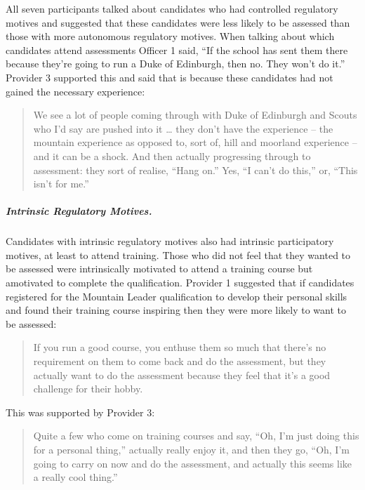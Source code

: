 \documentclass[
  12pt,
  a4paper,
]{book}
\begin{document}
All seven participants talked about candidates who had controlled regulatory motives and suggested that these candidates were less likely to be assessed than those with more autonomous regulatory motives. When talking about which candidates attend assessments Officer 1 said, ``If the school has sent them there because they're going to run a Duke of Edinburgh, then no. They won't do it.'' Provider 3 supported this and said that is because these candidates had not gained the necessary experience:

\begin{quote}
We see a lot of people coming through with Duke of Edinburgh and Scouts who I'd say are pushed into it \ldots{} they don't have the experience -- the mountain experience as opposed to, sort of, hill and moorland experience -- and it can be a shock. And then actually progressing through to assessment: they sort of realise, ``Hang on.'' Yes, ``I can't do this,'' or, ``This isn't for me.''
\end{quote}

\hypertarget{intrinsic-regulatory-motives.}{%
\subparagraph{Intrinsic Regulatory Motives.}\label{intrinsic-regulatory-motives.}}

Candidates with intrinsic regulatory motives also had intrinsic participatory motives, at least to attend training. Those who did not feel that they wanted to be assessed were intrinsically motivated to attend a training course but amotivated to complete the qualification. Provider 1 suggested that if candidates registered for the Mountain Leader qualification to develop their personal skills and found their training course inspiring then they were more likely to want to be assessed:

\begin{quote}
If you run a good course, you enthuse them so much that there's no requirement on them to come back and do the assessment, but they actually want to do the assessment because they feel that it's a good challenge for their hobby.
\end{quote}

This was supported by Provider 3:

\begin{quote}
Quite a few who come on training courses and say, ``Oh, I'm just doing this for a personal thing,'' actually really enjoy it, and then they go, ``Oh, I'm going to carry on now and do the assessment, and actually this seems like a really cool thing.''
\end{quote}
\end{document}
